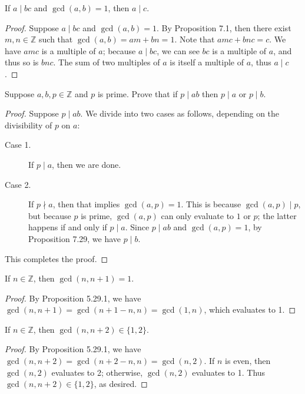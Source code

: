 \documentclass{exam}
\begin{document}
\begin{proposition}{7.29}
    If $a\mid bc$ and $\gcd(a,b)=1$, then $a\mid c$.
\end{proposition}

\begin{proof}
    Suppose $a\mid bc$ and $\gcd(a,b)=1$. By Proposition 7.1, then there exist $m, n\in\mathbb Z$ such that $\gcd(a,b) = am + bn = 1$. Note that $amc + bnc = c$. We have $amc$ is a multiple of $a$; because $a\mid bc$, we can see $bc$ is a multiple of $a$, and thus so is $bnc$. The sum of two multiples of $a$ is itself a multiple of $a$, thus $a \mid c$.
\end{proof}

\begin{proposition}{7.30}
    Suppose $a,b,p\in\mathbb Z$ and $p$ is prime. Prove that if $p\mid ab$ then $p\mid a$ or $p\mid b$.
\end{proposition}

\begin{proof}
    Suppose $p \mid ab$. We divide into two cases as follows, depending on the divisibility of $p$ on $a$:
    \begin{description}
        \item[Case 1. ] If $p \mid a$, then we are done.
        \item[Case 2. ] If $p\nmid a$, then that implies $\gcd(a, p) = 1$. This is because $\gcd(a, p) \mid p$, but because $p$ is prime, $\gcd(a, p)$ can only evaluate to $1$ or $p$; the latter happens if and only if $p \mid a$. Since $p \mid ab$ and $\gcd(a, p) = 1$, by Proposition 7.29, we have $p \mid b$.
    \end{description}
    This completes the proof.
\end{proof}

\begin{proposition}{7.31}
    If $n\in\mathbb Z$, then $\gcd(n, n+1) = 1$.
\end{proposition}

\begin{proof}
    By Proposition 5.29.1, we have $\gcd(n, n+1) = \gcd(n+1-n, n) = \gcd(1, n)$, which evaluates to 1.
\end{proof}

\begin{proposition}{7.32}
    If $n\in\mathbb Z$, then $\gcd(n,n+2)\in\{1,2\}$.
\end{proposition}

\begin{proof}
    By Proposition 5.29.1, we have $\gcd(n, n+2) = \gcd(n+2-n, n) = \gcd(n, 2)$. If $n$ is even, then $\gcd(n, 2)$ evaluates to 2; otherwise, $\gcd(n, 2)$ evaluates to 1. Thus $\gcd(n, n+2)\in\{1,2\}$, as desired.
\end{proof}
\end{document}
